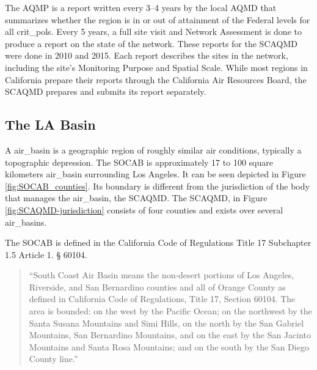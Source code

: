 \documentclass{article}
\begin{document}
The \ac{AQMP} is a report written every 3–4 years by the local \ac{AQMD} that summarizes whether the region is in or out of attainment of the Federal levels for all \glspl{crit_pol}.
Every 5 years, a full site visit and Network Assessment is done to produce a report on the state of the network. These reports for the \ac{SCAQMD} were done in 2010 and 2015.  Each report describes the sites in the network, including the site's Monitoring Purpose and Spatial Scale.  While most regions in California prepare their reports through the California Air Resources Board, the \ac{SCAQMD} prepares and submits its report separately.



\subsection{The LA Basin} \label{subsec:labasin}
A \gls{air_basin} is a geographic region of roughly similar air conditions, typically a topographic depression.  The \ac{SOCAB} is approximately 17 to 100 square kilometers \gls{air_basin} surrounding Los Angeles.  It can be seen depicted in Figure \ref{fig:SOCAB_counties}.  Its boundary is different from the jurisdiction of the body that manages the \gls{air_basin}, the \ac{SCAQMD}. The \ac{SCAQMD}, in Figure \ref{fig:SCAQMD-jurisdiction} consists of four counties and exists over several \glspl{air_basin}.  


The \ac{SOCAB} is defined in the California Code of Regulations Title 17  Subchapter 1.5  Article 1.  § 60104.   
\begin{quote}
``South Coast Air Basin means the non-desert portions of Los Angeles, Riverside, and San Bernardino counties and all of Orange County as defined in California Code of Regulations, Title 17, Section 60104. The area is bounded: on the west by the Pacific Ocean; on the northwest by the Santa Susana Mountains and Simi Hills, on the north by the San Gabriel Mountains, San Bernardino Mountains, and on the east by the San Jacinto Mountains and Santa Rosa Mountains; and on the south by the San Diego County line.''
    
\end{quote}
\end{document}
